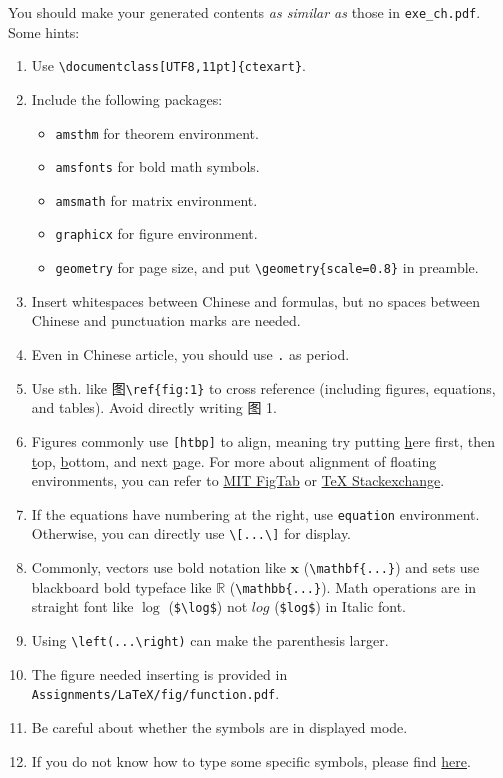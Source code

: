 \documentclass[english]{../TexTemplate/thesis}
\begin{document}
You should make your generated contents \emph{as similar as} those in \verb'exe_ch.pdf'.
Some hints:
\begin{enumerate}
	\item Use \verb'\documentclass[UTF8,11pt]{ctexart}'.
	\item Include the following packages:
	\begin{itemize}
		\item \verb'amsthm' for theorem environment.
		\item \verb'amsfonts' for bold math symbols.
		\item \verb'amsmath' for matrix environment.
		\item \verb'graphicx' for figure environment.
		\item \verb'geometry' for page size, and put \verb'\geometry{scale=0.8}' in preamble.
	\end{itemize}
	\item Insert whitespaces between Chinese and formulas, but no spaces between Chinese and punctuation marks are needed.
	\item Even in Chinese article, you should use \verb'.' as period.
	\item Use sth. like 图\verb'\ref{fig:1}' to cross reference (including figures, equations, and tables). Avoid directly writing 图 1.
	\item Figures commonly use \verb'[htbp]' to align, meaning try putting \underline{h}ere first, then \underline{t}op, \underline{b}ottom, and next \underline{p}age. For more about alignment of floating environments, you can refer to \href{http://web.mit.edu/molly/Public/mini/figtab.pdf}{MIT FigTab} or \href{https://tex.stackexchange.com/questions/2275/keeping-tables-figures-close-to-where-they-are-mentioned}{TeX Stackexchange}.
	\item If the equations have numbering at the right, use \verb'equation' environment.
	Otherwise, you can directly use \verb'\[...\]' for display.
	\item Commonly, vectors use bold notation like $\mathbf{x}$ (\verb'\mathbf{...}') and sets use blackboard bold typeface like $\mathbb{R}$ (\verb'\mathbb{...}'). Math operations are in straight font like $\log$ (\verb'$\log$') not $log$ (\verb'$log$') in Italic font.
	\item Using \verb'\left(...\right)' can make the parenthesis larger.
	\item The figure needed inserting is provided in \verb'Assignments/LaTeX/fig/function.pdf'.
	\item Be careful about whether the symbols are in displayed mode.
	\item If you do not know how to type some specific symbols, please find \href{https://katex.org/docs/supported.html}{here}.
\end{enumerate}
\end{document}
